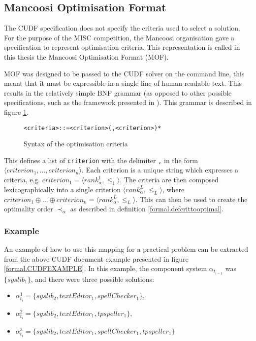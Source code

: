 \subsection{Mancoosi Optimisation Format}
\label{formal.mancoosioptimisationformat}
The CUDF specification does not specify the criteria used to select a solution.
For the purpose of the MISC competition, the Mancoosi organisation gave a specification to represent optimisation criteria.
This representation is called in this thesis the Mancoosi Optimisation Format (MOF).

MOF was designed to be passed to the CUDF solver on the command line, this meant that it must be expressible in a single line of human readable text.
This results in the relatively simple BNF grammar (as opposed to other possible specifications, such as the framework presented in \citep{Treinen2009}). 
This grammar is described in figure \ref{formal.optbnf}.
\begin{figure}[h!]
\begin{center}
\begin{alltt}
<criteria> ::= <criterion> (, <criterion>)*
\end{alltt}
  \caption{Syntax of the optimisation criteria}
  \label{formal.optbnf}
\end{center}
\end{figure}
This defines a list of \verb+criterion+ with the delimiter \verb+,+ in the form $\langle criterion_1, \ldots, criterion_n \rangle$.
Each criterion is a unique string which expresses a criteria, e.g. $criterion_1 = \langle rank^1_{\alpha}, \leq_1 \rangle$.
The criteria are then composed lexicographically into a single criterion $\langle  rank^L_{\alpha}, \leq_L \rangle$, 
where $criterion_1 \oplus \ldots \oplus criterion_n = \langle  rank^L_{\alpha}, \leq_L \rangle$. 
This can then be used to create the optimality order $\prec_{\alpha}$ as described in definition \ref{formal.defcrittooptimal}.

\subsubsection{Example}
An example of how to use this mapping for a practical problem can be extracted from the above CUDF document example presented in figure \ref{formal.CUDFEXAMPLE}.
In this example, the component system $\alpha_{t_{i-1}}$ was  $\{syslib_1\}$, and there were three possible solutions:
\begin{itemize}
  \item $\alpha_{t_i}^1 = \{syslib_2, textEditor_1, spellChecker_1\}$,
  \item $\alpha_{t_i}^2 = \{syslib_2, textEditor_1, tpspeller_1\}$,
  \item $\alpha_{t_i}^3 = \{syslib_2, textEditor_1, spellChecker_1, tpspeller_1\}$
\end{itemize}

